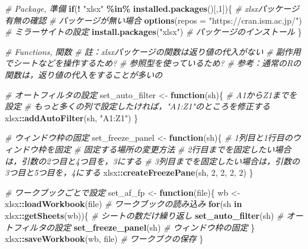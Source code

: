 \documentclass[
]{article}
\newenvironment{Shaded}{\begin{snugshade}}{\end{snugshade}}
\newcommand{\AttributeTok}[1]{\textcolor[rgb]{0.13,0.29,0.53}{#1}}
\newcommand{\CommentTok}[1]{\textcolor[rgb]{0.56,0.35,0.01}{\textit{#1}}}
\newcommand{\ControlFlowTok}[1]{\textcolor[rgb]{0.13,0.29,0.53}{\textbf{#1}}}
\newcommand{\DecValTok}[1]{\textcolor[rgb]{0.00,0.00,0.81}{#1}}
\newcommand{\FunctionTok}[1]{\textcolor[rgb]{0.13,0.29,0.53}{\textbf{#1}}}
\newcommand{\NormalTok}[1]{#1}
\newcommand{\OtherTok}[1]{\textcolor[rgb]{0.56,0.35,0.01}{#1}}
\newcommand{\SpecialCharTok}[1]{\textcolor[rgb]{0.81,0.36,0.00}{\textbf{#1}}}
\newcommand{\StringTok}[1]{\textcolor[rgb]{0.31,0.60,0.02}{#1}}
\begin{document}
\begin{Shaded}
\begin{Highlighting}[]
  \CommentTok{\# Package, 準備}
\ControlFlowTok{if}\NormalTok{(}\SpecialCharTok{!} \StringTok{"xlsx"} \SpecialCharTok{\%in\%} \FunctionTok{installed.packages}\NormalTok{()[,}\DecValTok{1}\NormalTok{])\{  }\CommentTok{\# xlsxパッケージ有無の確認}
  \CommentTok{\# パッケージが無い場合}
  \FunctionTok{options}\NormalTok{(}\AttributeTok{repos =} \StringTok{"https://cran.ism.ac.jp/"}\NormalTok{) }\CommentTok{\# ミラーサイトの設定}
  \FunctionTok{install.packages}\NormalTok{(}\StringTok{"xlsx"}\NormalTok{)                   }\CommentTok{\# パッケージのインストール}
\NormalTok{\}}

  \CommentTok{\# Functions, 関数}
  \CommentTok{\#   註：xlsxパッケージの関数は返り値の代入がない}
  \CommentTok{\#         副作用でシートなどを操作するため?}
  \CommentTok{\#         参照型を使っているため?}
  \CommentTok{\#   参考：通常のRの関数は，返り値の代入をすることが多いの}

  \CommentTok{\# オートフィルタの設定}
\NormalTok{set\_auto\_filter }\OtherTok{\textless{}{-}} \ControlFlowTok{function}\NormalTok{(sh)\{}
  \CommentTok{\# A1からZ1までを設定}
  \CommentTok{\#   もっと多くの列で設定したければ，"A1:Z1"のところを修正する}
\NormalTok{  xlsx}\SpecialCharTok{::}\FunctionTok{addAutoFilter}\NormalTok{(sh, }\StringTok{"A1:Z1"}\NormalTok{)}
\NormalTok{\}}

  \CommentTok{\# ウィンドウ枠の固定}
\NormalTok{set\_freeze\_panel }\OtherTok{\textless{}{-}} \ControlFlowTok{function}\NormalTok{(sh)\{}
  \CommentTok{\# 1列目と1行目のウィンドウ枠を固定}
  \CommentTok{\#   固定する場所の変更方法}
  \CommentTok{\#     2行目までを固定したい場合は，引数の2つ目と4つ目を，3にする}
  \CommentTok{\#     3列目までを固定したい場合は，引数の3つ目と5つ目を，4にする}
\NormalTok{  xlsx}\SpecialCharTok{::}\FunctionTok{createFreezePane}\NormalTok{(sh, }\DecValTok{2}\NormalTok{, }\DecValTok{2}\NormalTok{, }\DecValTok{2}\NormalTok{, }\DecValTok{2}\NormalTok{)}
\NormalTok{\}}

  \CommentTok{\# ワークブックごとで設定}
\NormalTok{set\_af\_fp }\OtherTok{\textless{}{-}} \ControlFlowTok{function}\NormalTok{(file)\{}
\NormalTok{  wb }\OtherTok{\textless{}{-}}\NormalTok{ xlsx}\SpecialCharTok{::}\FunctionTok{loadWorkbook}\NormalTok{(file)   }\CommentTok{\# ワークブックの読み込み}
  \ControlFlowTok{for}\NormalTok{(sh }\ControlFlowTok{in}\NormalTok{ xlsx}\SpecialCharTok{::}\FunctionTok{getSheets}\NormalTok{(wb))\{  }\CommentTok{\# シートの数だけ繰り返し}
    \FunctionTok{set\_auto\_filter}\NormalTok{(sh)            }\CommentTok{\#   オートフィルタの設定}
    \FunctionTok{set\_freeze\_panel}\NormalTok{(sh)           }\CommentTok{\#   ウィンドウ枠の固定}
\NormalTok{  \}}
\NormalTok{  xlsx}\SpecialCharTok{::}\FunctionTok{saveWorkbook}\NormalTok{(wb, file)     }\CommentTok{\# ワークブクの保存}
\NormalTok{\}}


\end{Highlighting}
\end{Shaded}
\end{document}
